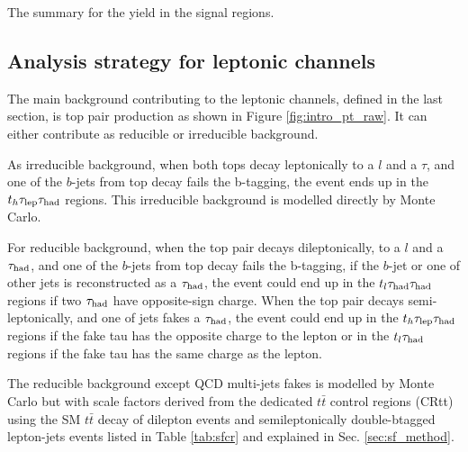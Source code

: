 \begin{table}
\caption{The summary for the yield in the signal regions.}
\label{tab:yield_SR}
\small


\end{table}

\subsection{Analysis strategy for leptonic channels}

The main background contributing to the leptonic channels, defined in the last section, is top pair production as shown in Figure \ref{fig:intro_pt_raw}. It can either contribute as reducible or irreducible background.



As irreducible background, when both tops decay leptonically to a $l$ and a $\tau$, and one of the $b$-jets from top decay fails the b-tagging, the event ends up in the $t_h\tau_\text{lep}{}\tau_\text{had}$ regions. This irreducible background is modelled directly by Monte Carlo.

For reducible background, when the top pair decays dileptonically, to a $l$ and a $\tau_\text{had}$, and one of the $b$-jets from top decay fails the b-tagging, if the $b$-jet or one of other jets is reconstructed as a $\tau_\text{had}$, the event could end up in the $t_l\tau_\text{had}{}\tau_\text{had}$ regions if two $\tau_\text{had}$ have opposite-sign charge. When the top pair decays semi-leptonically, and one of jets fakes a $\tau_\text{had}$, the event could end up in the  $t_h\tau_\text{lep}{}\tau_\text{had}$ regions if the fake tau has the opposite charge to the lepton or in the $t_l\tau_\text{had}$ regions if the fake tau has the same charge as the lepton. 

The reducible background except QCD multi-jets fakes is modelled by Monte Carlo but with scale factors derived from the dedicated $t\bar{t}$ control regions (CRtt) using the SM
$t\bar{t}$ decay of dilepton events and semileptonically double-btagged lepton-jets events listed
in Table \ref{tab:sfcr} and explained in Sec. \ref{sec:sf_method}.

